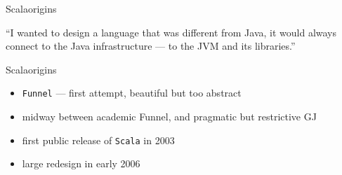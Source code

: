 \documentclass[aspectratio=169]{beamer}
\begin{document}
\begin{frame}{Scala}{origins}
  \begin{exampleblock}{}
    {\large ``I wanted to design a language that was different from Java,
              it would always connect to the Java infrastructure — to the JVM and its libraries.''}
    \vskip3mm
    \hspace*{}
  \end{exampleblock}
\end{frame}

\begin{frame}{Scala}{origins}
\begin{itemize}
  \item \texttt{Funnel} --- first attempt, beautiful but too abstract \large\Cross
  \item midway between academic Funnel, and pragmatic but restrictive GJ
  \item first public release of \texttt{Scala} in 2003
  \item large redesign in early 2006
\end{itemize}
\end{frame}
\end{document}
